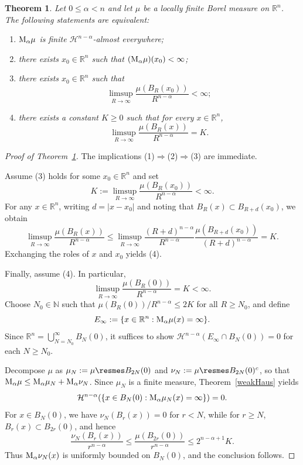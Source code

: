 \documentclass[11pt, a4paper, reqno]{amsart}
\newcommand{\R}{\mathbb R}
\newcommand{\Haus}{\mathcal H }
\newtheorem{theorem}{Theorem}[section]
\theoremstyle{definition}
\theoremstyle{remark}
\begin{document}
\begin{theorem}\label{Malfinitevar}
Let $0\le\alpha<n$ and let $\mu$ be a locally finite Borel measure on $\R^n$. The following statements are equivalent:
\begin{enumerate}
\item $\textup{M}_\alpha\mu$ is finite $\Haus^{n-\alpha}$-almost everywhere;
\item there exists $x_0\in\R^n$ such that $(\textup{M}_\alpha\mu)(x_0)<\infty$;
\item there exists $x_0\in\R^n$ such that
\[
\limsup_{R\to\infty} \frac{\mu(B_R(x_0))}{R^{n-\alpha}} < \infty;
\]
\item there exists a constant $K\ge0$ such that for every $x\in\R^n$,
\[
\limsup_{R\to\infty} \frac{\mu(B_R(x))}{R^{n-\alpha}} = K.
\]
\end{enumerate}
\end{theorem}

\begin{proof}[Proof of Theorem~\ref{Malfinitevar}]
The implications (1)$\Rightarrow$(2)$\Rightarrow$(3) are immediate.

Assume (3) holds for some $x_0\in\R^n$ and set
\[
K := \limsup_{R\to\infty} \frac{\mu(B_R(x_0))}{R^{n-\alpha}} < \infty.
\]
For any $x\in\R^n$, writing $d=|x-x_0|$ and noting that $B_R(x)\subset B_{R+d}(x_0)$, we obtain
\[
\limsup_{R\to\infty} \frac{\mu(B_R(x))}{R^{n-\alpha}}
\le \limsup_{R\to\infty} \frac{(R+d)^{n-\alpha}}{R^{n-\alpha}}
\frac{\mu(B_{R+d}(x_0))}{(R+d)^{n-\alpha}}
= K.
\]
Exchanging the roles of $x$ and $x_0$ yields (4).

Finally, assume (4). In particular,
\[
\limsup_{R\to\infty} \frac{\mu(B_R(0))}{R^{n-\alpha}} = K < \infty.
\]
Choose $N_0\in\mathbb{N}$ such that $\mu(B_R(0))/R^{n-\alpha}\le 2K$ for all $R\ge N_0$, and define
\[
E_\infty := \{x\in\R^n : \textup{M}_\alpha\mu(x)=\infty\}.
\]
Since $\R^n=\bigcup_{N=N_0}^\infty B_N(0)$, it suffices to show
$\mathcal H^{n-\alpha}(E_\infty\cap B_N(0))=0$ for each $N\ge N_0$.

Decompose $\mu$ as $\mu_N := \mu\resmes B_{2N}(0)$ and
$\nu_N := \mu\resmes B_{2N}(0)^c$, so that
$\textup{M}_\alpha\mu \le \textup{M}_\alpha\mu_N + \textup{M}_\alpha\nu_N$.
Since $\mu_N$ is a finite measure, Theorem~\ref{weakHaus} yields
\[
\mathcal H^{n-\alpha}(\{x\in B_N(0) : \textup{M}_\alpha\mu_N(x)=\infty\})=0.
\]
For $x\in B_N(0)$, we have $\nu_N(B_r(x))=0$ for $r<N$, while for $r\ge N$,
$B_r(x)\subset B_{2r}(0)$, and hence
\[
\frac{\nu_N(B_r(x))}{r^{n-\alpha}}
\le \frac{\mu(B_{2r}(0))}{r^{n-\alpha}}
\le 2^{n-\alpha+1}K.
\]
Thus $\textup{M}_\alpha\nu_N(x)$ is uniformly bounded on $B_N(0)$, and the conclusion follows.
\end{proof}
\end{document}
